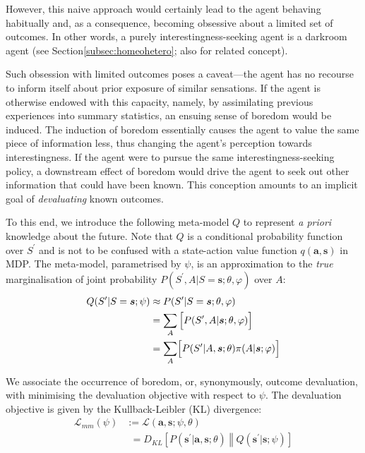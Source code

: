 \documentclass[utf8]{frontiersSCNS}
\newcommand{\bs}{\boldsymbol}
\begin{document}
However, this naive approach would certainly lead to the agent behaving habitually and, as a consequence, becoming obsessive about a limited set of outcomes. In other words, a purely interestingness-seeking agent is a darkroom agent (see Section\ref{subsec:homeohetero}; also \citet{darkroom} for related concept).

Such obsession with limited outcomes poses a caveat---the agent has no recourse to inform itself about prior exposure of similar sensations. If the agent is otherwise endowed with this capacity, namely, by assimilating previous experiences into summary statistics, an ensuing sense of boredom would be induced. The induction of boredom essentially causes the agent to value the same piece of information less, thus changing the agent's perception towards interestingness. If the agent were to pursue the same interestingness-seeking policy, a downstream effect of boredom would drive the agent to seek out other information that could have been known. This conception amounts to an implicit goal of {\it devaluating} known outcomes.

To this end, we introduce the following meta-model $Q$ to represent {\it a priori} knowledge about the future. Note that $Q$ is a conditional probability function over $S^\prime$ and is not to be confused with a state-action value function $q(\bs a, \bs s)$ in MDP. The meta-model, parametrised by $\psi$, is an approximation to the {\it true} marginalisation of joint probability $P(S^\prime, A|S=\bs{s}; \theta, \varphi)$ over $A$:
%
	\begin{equation}
	\begin{aligned} \label{eq:mm}
	Q(S^\prime | S=\bs{s}; \psi) & \approx 
		P (S^\prime | S=\bs{s}; \theta, \varphi) \\
		&= \sum_A \Big[ P(S^\prime, A|\bs{s}; \theta, \varphi) \Bigr] \\
		&= \sum_A \Bigl[ P (S^\prime| A, \bs{s}; \theta) \pi(A|\bs{s}; \varphi) \Bigr] \\
	\end{aligned}
	\end{equation}
%

We associate the occurrence of boredom, or, synonymously, outcome devaluation, with minimising the devaluation objective with respect to $\psi$. The devaluation objective is given by the Kullback-Leibler (KL) divergence:
%
	\begin{equation}
	\begin{aligned} \label{eq:mm-loss}
	\mathcal{L}_{mm}(\psi) &:=
	\mathcal{L}(\bs{a}, \bs{s}; \psi, \theta) \\
		&\phantom{:}= 
		D_{KL}\left[ P(\bs{s}^\prime|\bs{a}, \bs{s}; \theta) 
		\middle\Vert 
		Q(\bs{s}^\prime|\bs{s}; \psi) \right]
	\end{aligned}
	\end{equation}
%
\end{document}
